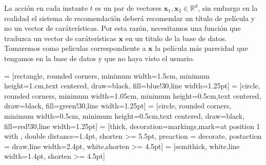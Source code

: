 \begin{obs}
    La acción en cada instante $t$ es un par de vectores $\bm{x}_1,\bm{x}_2 \in \mathbb{R}^d$, sin embargo en la realidad el sistema de recomendación deberá recomendar un título de película y no un vector de caráterísticas. Por esta razón, necesitamos una función que traduzca un vector de caráterísticas $\bm{x}$ en un titulo de la base de datos. Tomaremos como peliculas correspondiente a $\bm{x}$ la película más parecidad que tengamos en la base de datos y que no haya visto el usuario.
\end{obs}




 = [rectangle, rounded corners, minimum width=1.5cm, minimum height=1.cm,text centered, draw=black, fill=blue!30,line width=1.25pt]
%
 = [circle, rounded corners, minimum width=1.05cm, minimum height=0.5cm,text centered, draw=black, fill=green!30,line width=1.25pt]
%
 = [circle, rounded corners, minimum width=0.5cm, minimum height=0.5cm,text centered, draw=black, fill=red!30,line width=1.25pt]
 = [thick, decoration={markings,mark=at position
   1 with {}},
   double distance=1.4pt, shorten >= 5.5pt,
   preaction = {decorate},
   postaction = {draw,line width=2.4pt, white,shorten >= 4.5pt}]
 = [semithick, white,line width=1.4pt, shorten >= 4.5pt]

